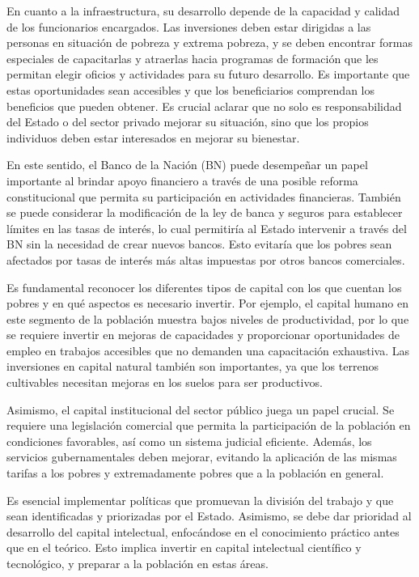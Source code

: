 \documentclass[
  letterpaper,
  DIV=11,
  numbers=noendperiod]{scrartcl}
\begin{document}
En cuanto a la infraestructura, su desarrollo depende de la capacidad y
calidad de los funcionarios encargados. Las inversiones deben estar
dirigidas a las personas en situación de pobreza y extrema pobreza, y se
deben encontrar formas especiales de capacitarlas y atraerlas hacia
programas de formación que les permitan elegir oficios y actividades
para su futuro desarrollo. Es importante que estas oportunidades sean
accesibles y que los beneficiarios comprendan los beneficios que pueden
obtener. Es crucial aclarar que no solo es responsabilidad del Estado o
del sector privado mejorar su situación, sino que los propios individuos
deben estar interesados en mejorar su bienestar.

En este sentido, el Banco de la Nación (BN) puede desempeñar un papel
importante al brindar apoyo financiero a través de una posible reforma
constitucional que permita su participación en actividades financieras.
También se puede considerar la modificación de la ley de banca y seguros
para establecer límites en las tasas de interés, lo cual permitiría al
Estado intervenir a través del BN sin la necesidad de crear nuevos
bancos. Esto evitaría que los pobres sean afectados por tasas de interés
más altas impuestas por otros bancos comerciales.

Es fundamental reconocer los diferentes tipos de capital con los que
cuentan los pobres y en qué aspectos es necesario invertir. Por ejemplo,
el capital humano en este segmento de la población muestra bajos niveles
de productividad, por lo que se requiere invertir en mejoras de
capacidades y proporcionar oportunidades de empleo en trabajos
accesibles que no demanden una capacitación exhaustiva. Las inversiones
en capital natural también son importantes, ya que los terrenos
cultivables necesitan mejoras en los suelos para ser productivos.

Asimismo, el capital institucional del sector público juega un papel
crucial. Se requiere una legislación comercial que permita la
participación de la población en condiciones favorables, así como un
sistema judicial eficiente. Además, los servicios gubernamentales deben
mejorar, evitando la aplicación de las mismas tarifas a los pobres y
extremadamente pobres que a la población en general.

Es esencial implementar políticas que promuevan la división del trabajo
y que sean identificadas y priorizadas por el Estado. Asimismo, se debe
dar prioridad al desarrollo del capital intelectual, enfocándose en el
conocimiento práctico antes que en el teórico. Esto implica invertir en
capital intelectual científico y tecnológico, y preparar a la población
en estas áreas.
\end{document}
